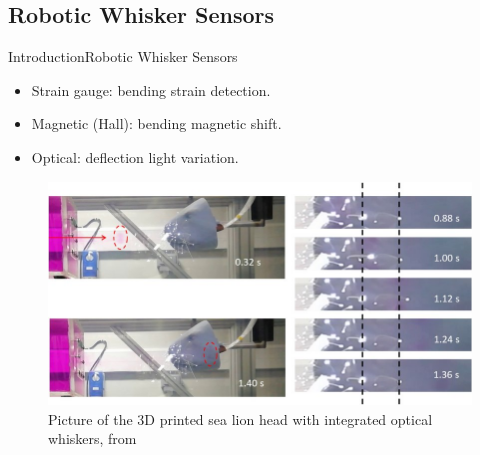 \documentclass[AIRbeamer
,optEnglish
,optBiber
,optBibstyleAlphabetic
,optBeamerClassicFormat%
]{AIRlatex}
\begin{document}
    \subsection{Robotic Whisker Sensors}
    \begin{frame}[c]{Introduction}{Robotic Whisker Sensors}
        \begin{itemize}
            \item Strain gauge: bending \to strain detection.
            \item Magnetic (Hall): bending \to magnetic shift.
            \item Optical: deflection \to light variation.
        \end{itemize}
        \begin{figure}[H]
            \centering
            \includegraphics[height=0.5\textheight]{figures/optical-whisker}
            \caption{Picture of the 3D printed sea lion head with integrated optical whiskers, from \cite{optical-whisker}}
        \end{figure}
    \end{frame}
\end{document}
